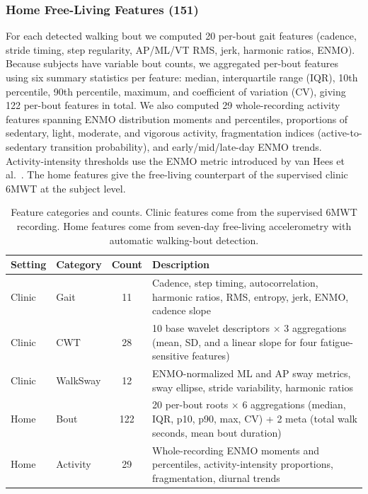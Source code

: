 \documentclass{article}
\begin{document}
\subsubsection{Home Free-Living Features (151)}
For each detected walking bout we computed 20 per-bout gait features (cadence, stride timing, step regularity, AP/ML/VT RMS, jerk, harmonic ratios, ENMO). Because subjects have variable bout counts, we aggregated per-bout features using six summary statistics per feature: median, interquartile range (IQR), 10th percentile, 90th percentile, maximum, and coefficient of variation (CV), giving 122 per-bout features in total. We also computed 29 whole-recording activity features spanning ENMO distribution moments and percentiles, proportions of sedentary, light, moderate, and vigorous activity, fragmentation indices (active-to-sedentary transition probability), and early/mid/late-day ENMO trends. Activity-intensity thresholds use the ENMO metric introduced by van Hees et al.~\cite{vanhees2013separating}. The home features give the free-living counterpart of the supervised clinic 6MWT at the subject level.

\begin{table}[!ht]
\centering
\caption{Feature categories and counts. Clinic features come from the supervised 6MWT recording. Home features come from seven-day free-living accelerometry with automatic walking-bout detection.}
\label{tab:features}
\small
\begin{tabular}{@{}p{1.2cm}p{2.4cm}cp{8.5cm}@{}}
\toprule
Setting & Category & Count & Description \\
\midrule
Clinic & Gait & 11 & Cadence, step timing, autocorrelation, harmonic ratios, RMS, entropy, jerk, ENMO, cadence slope \\
\addlinespace
Clinic & CWT & 28 & 10 base wavelet descriptors $\times$ 3 aggregations (mean, SD, and a linear slope for four fatigue-sensitive features) \\
\addlinespace
Clinic & WalkSway & 12 & ENMO-normalized ML and AP sway metrics, sway ellipse, stride variability, harmonic ratios \\
\addlinespace
Home & Bout & 122 & 20 per-bout roots $\times$ 6 aggregations (median, IQR, p10, p90, max, CV) + 2 meta (total walk seconds, mean bout duration) \\
\addlinespace
Home & Activity & 29 & Whole-recording ENMO moments and percentiles, activity-intensity proportions, fragmentation, diurnal trends \\
\bottomrule
\end{tabular}
\end{table}
\end{document}
